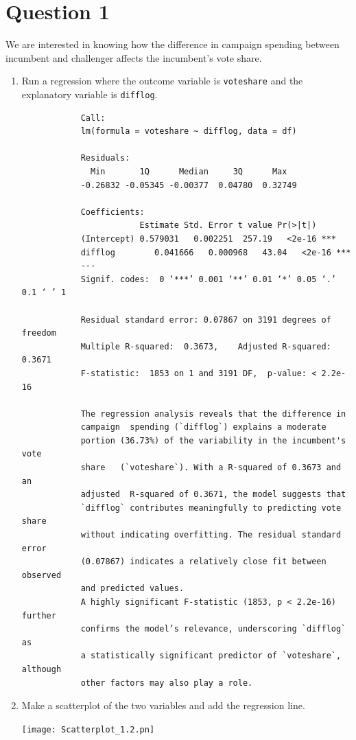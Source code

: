 \documentclass[12pt,letterpaper]{article}
\begin{document}
\section*{Question 1}
\vspace{.25cm}
\noindent We are interested in knowing how the difference in campaign spending between incumbent and challenger affects the incumbent's vote share. 
	\begin{enumerate}
		\item Run a regression where the outcome variable is \texttt{voteshare} and the explanatory variable is \texttt{difflog}.
			  
			\begin{verbatim} 
			Call:
			lm(formula = voteshare ~ difflog, data = df)
			
			Residuals:
			  Min       1Q      Median     3Q      Max 
			-0.26832 -0.05345 -0.00377  0.04780  0.32749 
			
			Coefficients:
			            Estimate Std. Error t value Pr(>|t|)    
			(Intercept) 0.579031   0.002251  257.19   <2e-16 ***
			difflog        0.041666   0.000968   43.04   <2e-16 ***
			---
			Signif. codes:  0 ‘***’ 0.001 ‘**’ 0.01 ‘*’ 0.05 ‘.’ 0.1 ‘ ’ 1
			
			Residual standard error: 0.07867 on 3191 degrees of freedom
			Multiple R-squared:  0.3673,	Adjusted R-squared:  0.3671 
			F-statistic:  1853 on 1 and 3191 DF,  p-value: < 2.2e-16
	 	
			The regression analysis reveals that the difference in 
			campaign  spending (`difflog`) explains a moderate 
			portion (36.73%) of the variability in the incumbent's vote 
			share   (`voteshare`). With a R-squared of 0.3673 and an 
			adjusted  R-squared of 0.3671, the model suggests that 
			`difflog` contributes meaningfully to predicting vote share 
			without indicating overfitting. The residual standard error 
			(0.07867) indicates a relatively close fit between observed 
			and predicted values. 
			A highly significant F-statistic (1853, p < 2.2e-16) further 
			confirms the model’s relevance, underscoring `difflog` as 
			a statistically significant predictor of `voteshare`, although
			other factors may also play a role.
		\end{verbatim}	
		
		
		\item Make a scatterplot of the two variables and add the regression line. 	
		  
		\texttt{[image: Scatterplot\_1.2.pn]}
		

\end{enumerate}
\end{document}
